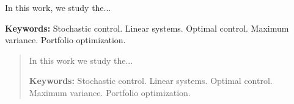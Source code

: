 \begin{summary}

    In this work, we study the...

    \vspace{1\baselineskip}

    \textbf{Keywords:} Stochastic control. Linear systems. Optimal control. Maximum variance. Portfolio optimization.

\end{summary}



\begin{abstract}

    In this work we study the...

    \vspace{1\baselineskip}

    \textbf{Keywords:} Stochastic control. Linear systems. Optimal control. Maximum variance. Portfolio optimization.

\end{abstract}
